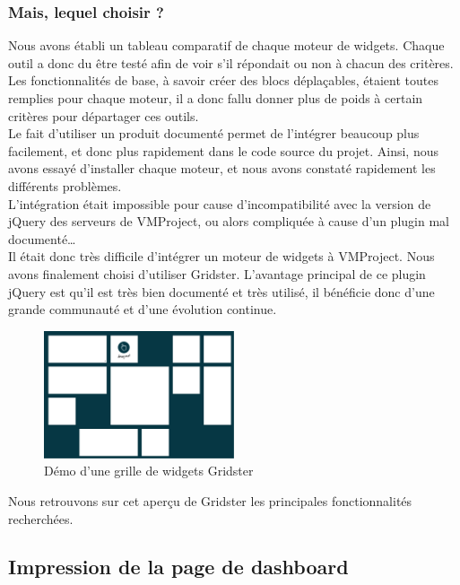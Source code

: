 \documentclass[12pt]{report}
\begin{document}
	\subsubsection{Mais, lequel choisir ?}
	
	Nous avons établi un tableau comparatif de chaque moteur de widgets. Chaque outil a donc du être testé afin de voir s’il répondait ou non à chacun des critères. Les fonctionnalités de base, à savoir créer des blocs déplaçables, étaient toutes remplies pour chaque moteur, il a donc fallu donner plus de poids à certain critères pour départager ces outils. \\

Le fait d’utiliser un produit documenté permet de l’intégrer beaucoup plus facilement, et donc plus rapidement dans le code source du projet. Ainsi, nous avons essayé d’installer chaque moteur, et nous avons constaté rapidement les différents problèmes.\\
L’intégration était impossible pour cause d’incompatibilité avec la version de jQuery des serveurs de VMProject, ou alors compliquée à cause d’un plugin mal documenté…\\

Il était donc très difficile d’intégrer un moteur de widgets à VMProject. Nous avons finalement choisi d’utiliser Gridster. L’avantage principal de ce plugin jQuery est qu’il est très bien documenté et très utilisé, il bénéficie donc d’une grande communauté et d’une évolution continue.\\
	
	\begin{figure}[H]
	\centering
	\includegraphics[width=0.5\textwidth]{pictures/matthieu/m_gridster.png}
	\caption{Démo d'une grille de widgets Gridster}
	\label{w1}
\end{figure}

Nous retrouvons sur cet aperçu de Gridster les principales fonctionnalités recherchées.

\subsection{Impression de la page de dashboard}
\end{document}
